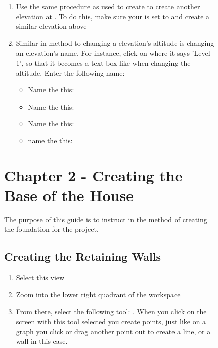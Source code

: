 \documentclass{tufte-book} %
\begin{document}
\begin{figure}
\begin{enumerate}
	\item Use the same procedure as used to create  to create another elevation at . To do this, make sure your  is set to  and create a similar elevation above 
	\item Similar in method to changing a elevation's altitude is changing an elevation's name. For instance, click on  where it says 'Level 1', so that it becomes a text box like when changing the altitude. Enter the following name: 

	\begin{itemize}
		\item Name the  this: 
		\item Name the  this: 
		\item Name the  this: 
		\item name the  this: 
	\end{itemize}
\end{enumerate}


%
%



\chapter{Chapter 2 - Creating the Base of the House}
\label{ch:2}
The purpose of this guide is to instruct in the method of creating the foundation for the project.
\section{Creating the Retaining Walls}
\begin{enumerate}


	\item Select this view 
	\item Zoom into the lower right quadrant of the workspace
	\item From there, select the following tool: . When you click on the screen with this tool selected you create points, just like on a graph you click or drag another point out to create a line, or a wall in this case.


\end{enumerate}
\end{figure}
\end{document}
